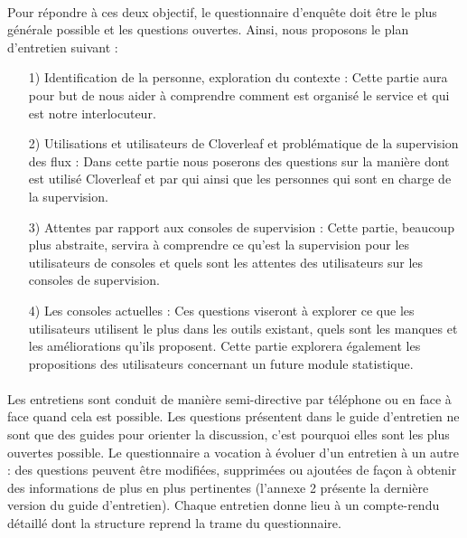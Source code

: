 			\paragraph{}%
			Pour répondre à ces deux objectif, le questionnaire d’enquête doit être le
			plus générale possible et les questions ouvertes. Ainsi, nous proposons le
			plan d'entretien suivant :
			\begin{itemize}
			  \item[1) Identification de la personne, exploration du contexte :] Cette
			  partie aura pour but de nous aider à comprendre comment est organisé le
			  service et qui est notre interlocuteur.
			  \item[2) Utilisations et utilisateurs de Cloverleaf et problématique de la
			  supervision des flux :] Dans cette partie nous poserons des questions sur
			  la manière dont est utilisé Cloverleaf et par qui ainsi que les personnes
			  qui sont en charge de la supervision.
			  \item[3) Attentes par rapport aux consoles de supervision :] Cette partie,
			  beaucoup plus abstraite, servira à comprendre ce qu’est la supervision
			  pour les utilisateurs de consoles et quels sont les attentes des
			  utilisateurs sur les consoles de supervision.
			  \item[4) Les consoles actuelles :] Ces questions viseront à explorer ce que
			  les utilisateurs utilisent le plus dans les outils existant, quels sont
			  les manques et les améliorations qu’ils proposent. Cette partie explorera
			  également les propositions des utilisateurs concernant un future module
			  statistique.
			\end{itemize}
			
			\paragraph{}%
			Les entretiens sont conduit de manière semi-directive par téléphone ou en
			face à face quand cela est possible.
			Les questions présentent dans le guide d'entretien ne sont que des guides
			pour orienter la discussion, c’est pourquoi elles sont les plus ouvertes possible.\newline
			Le questionnaire a vocation à évoluer d’un entretien à un autre : des
			questions peuvent être modifiées, supprimées ou ajoutées de façon à obtenir
			des informations de plus en plus pertinentes (l'annexe 2 présente la dernière
			version du guide d'entretien). Chaque entretien donne lieu à un compte-rendu
			détaillé dont la structure reprend la trame du questionnaire.
			
